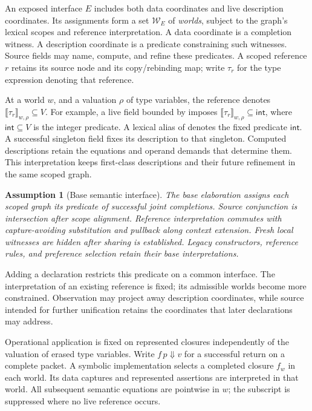 \documentclass[10pt,a4paper]{article}
\newcommand{\code}[1]{\texttt{\detokenize{#1}}}
\newcommand{\sem}[1]{\llbracket #1\rrbracket}
\newcommand{\Int}{\mathsf{int}}
\newtheorem{assumption}[definition]{Assumption}
\theoremstyle{remark}
\newcounter{example}[section]
\begin{document}
An exposed interface $E$ includes both data coordinates and live description
coordinates. Its assignments form a set $\mathcal W_E$ of \emph{worlds}, subject
to the graph's lexical scopes and reference interpretation. A data coordinate
is a completion witness. A description coordinate is a predicate constraining
such witnesses. Source fields may name, compute, and refine these predicates.
A scoped reference $r$ retains its source node and its copy/rebinding map; write
$\tau_r$ for the type expression denoting that reference.

At a world $w$, and a valuation $\rho$ of type variables, the reference denotes
$\sem{\tau_r}_{w,\rho}\subseteq V$. For example, a live field bounded by
\code{int} imposes $\sem{\tau_r}_{w,\rho}\subseteq\Int$, where
$\Int\subseteq V$ is the integer predicate. A lexical alias of \code{int}
denotes the fixed predicate $\Int$. A successful singleton field fixes its
description to that singleton. Computed descriptions retain the equations and
operand demands that determine them. This interpretation keeps first-class
descriptions and their future refinement in the same scoped graph.

\begin{assumption}[Base semantic interface]\label{ass:base}
The base elaboration assigns each scoped graph its predicate of successful
joint completions. Source conjunction is intersection after scope alignment.
Reference interpretation commutes with capture-avoiding substitution and
pullback along context extension. Fresh local witnesses are hidden after
sharing is established. Legacy constructors, reference rules, and preference
selection retain their base interpretations.
\end{assumption}

Adding a declaration restricts this predicate on a common interface. The
interpretation of an existing reference is fixed; its admissible worlds become
more constrained. Observation may project away description coordinates, while
source intended for further unification retains the coordinates that later
declarations may address.

Operational application is fixed on represented closures independently of the
valuation of erased type variables. Write $f\,p\Downarrow v$ for a successful
return on a complete packet. A symbolic implementation selects a completed
closure $f_w$ in each world. Its data captures and represented assertions are
interpreted in that world. All subsequent semantic equations are pointwise in
$w$; the subscript is suppressed where no live reference occurs.
\end{document}
